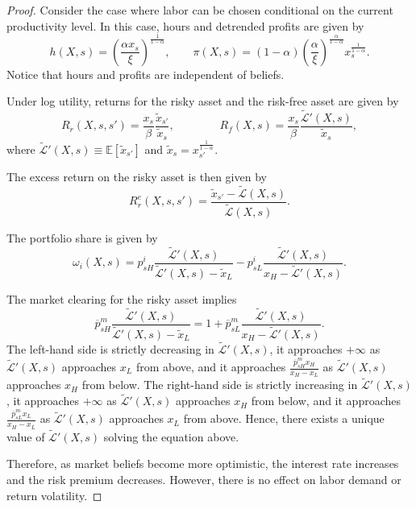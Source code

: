 \begin{proof}
Consider the case where labor can be chosen conditional on the current productivity level.
In this case, hours and detrended profits are given by
\begin{equation}
    h(X,s) = \left( \frac{\alpha x_s}{\xi} \right)^{\frac{1}{1-\alpha}},\qquad
    \pi(X,s) = (1-\alpha) \left( \frac{\alpha}{\xi} \right)^{\frac{\alpha}{1-\alpha}} x_s^{\frac{1}{1-\alpha}}.
\end{equation}
Notice that hours and profits are independent of beliefs. 

Under log utility, returns for the risky asset and the risk-free asset are given by
\begin{equation}
    R_r(X,s,s') = \frac{x_s}{\beta} \frac{\tilde{x}_{s'}}{\tilde{x}_s}, \qquad \qquad 
    R_f(X,s) =\frac{x_s}{\beta}\frac{\tilde{\mathcal{L}}'(X,s)}{\tilde{x}_{s}},
\end{equation}
where $\tilde{\mathcal{L}}'(X,s) \equiv \mathbb{E}\left[ \tilde{x}_{s'} \right]$ and $\tilde{x}_{s} = x_{s'}^{\frac{1}{1-\alpha}}$.

The excess return on the risky asset is then given by
\begin{equation}
    R_r^e(X,s,s') = \frac{\tilde{x}_{s'} - \tilde{\mathcal{L}}(X,s)}{\tilde{\mathcal{L}}(X,s)}.
\end{equation}

The portfolio share is given by
\begin{equation}
    \omega_i(X,s) = p_{sH}^i\frac{\tilde{\mathcal{L}}'(X,s)}{\tilde{\mathcal{L}}'(X,s) - \tilde{x}_L}  -p_{sL}^i\frac{\tilde{\mathcal{L}}'(X,s)}{x_H-\tilde{\mathcal{L}}'(X,s)}.
\end{equation}

The market clearing for the risky asset implies
\begin{equation}
    \overline{p}_{sH}^m \frac{\tilde{\mathcal{L}}'(X,s)}{\tilde{\mathcal{L}}'(X,s) - \tilde{x}_L} = 1 + \overline{p}_{sL}^m\frac{\tilde{\mathcal{L}}'(X,s)}{x_H-\tilde{\mathcal{L}}'(X,s)}.
\end{equation}
The left-hand side is strictly decreasing in $\tilde{\mathcal{L}}'(X,s)$, it approaches $+\infty$ as $\tilde{\mathcal{L}}'(X,s)$ approaches $x_L$ from above, and it approaches $\frac{\overline{p}_{sH}^m x_H}{x_H - x_L}$ as $\tilde{\mathcal{L}}'(X,s)$ approaches $x_H$ from below.
The right-hand side is strictly increasing in $\tilde{\mathcal{L}}'(X,s)$, it approaches $+\infty$ as $\tilde{\mathcal{L}}'(X,s)$ approaches $x_H$ from below, and it approaches $\frac{\overline{p}_{sL}^m x_L}{x_H - x_L}$ as $\tilde{\mathcal{L}}'(X,s)$ approaches $x_L$ from above.
Hence, there exists a unique value of $\tilde{\mathcal{L}}'(X,s)$ solving the equation above.

Therefore, as market beliefs become more optimistic, the interest rate increases and the risk premium decreases.
However, there is no effect on labor demand or return volatility. 
\end{proof}

